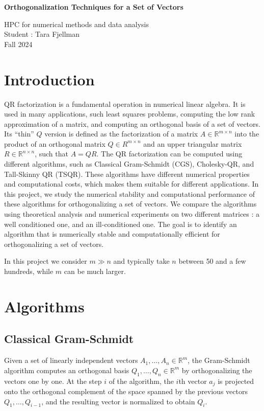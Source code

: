 \documentclass[a4paper, 12pt,oneside]{article}
\begin{document}
 
	\begin{center}
	    \Large
	    \textbf{Orthogonalization Techniques for a Set of Vectors}
	        
	    \vspace{0.4cm}
	    \large
		HPC for numerical methods and data analysis \\
	    Student : Tara Fjellman \\
	    \small{Fall 2024}
	\end{center}
	\section{Introduction}
	QR factorization is a fundamental operation in numerical linear algebra. It is used in many applications, such least squares problems, computing the low rank approximation of a matrix, and computing an orthogonal basis of a set of vectors. Its ``thin'' $Q$ version is defined as the factorization of a matrix ${A}\in \mathbb{R}^{m \times n}$ into the product of an orthogonal matrix ${Q}\in {R}^{m \times n}$ and an upper triangular matrix ${R}\in \mathbb{R}^{n \times n}$, such that ${A} = {Q} {R}$. The QR factorization can be computed using different algorithms, such as Classical Gram-Schmidt (CGS), Cholesky-QR, and Tall-Skinny QR (TSQR). These algorithms have different numerical properties and computational costs, which makes them suitable for different applications. In this project, we study the numerical stability and computational performance of these algorithms for orthogonalizing a set of vectors. We compare the algorithms using theoretical analysis and numerical experiments on two different matrices : a well conditioned one, and an ill-conditioned one. The goal is to identify an algorithm that is numerically stable and computationally efficient for orthogonalizing a set of vectors.

	In this project we consider $m \gg n$ and typically take $n$ between 50 and a few hundreds, while $m$ can be much larger.
	\section{Algorithms}
		\subsection{Classical Gram-Schmidt}
			Given a set of linearly independent vectors $A_1, \ldots, A_n \in \mathbb{R}^m$, the Gram-Schmidt algorithm computes an orthogonal basis $Q_1, \ldots, Q_n \in \mathbb{R}^m$ by orthogonalizing the vectors one by one. At the step $i$ of the algorithm, the $i$th vector $a_j$ is projected onto the orthogonal complement of the space spanned by the previous vectors $Q_1, \ldots, Q_{i-1}$, and the resulting vector is normalized to obtain $Q_i$.
\end{document}
